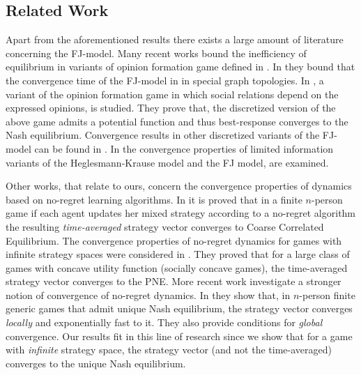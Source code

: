 \subsection{Related Work}
Apart from the aforementioned results there exists a large amount
of literature concerning the FJ-model.
Many recent works \cite{BGM13,CKO13,BFM16,EFHS17} bound the
inefficiency of equilibrium in variants of opinion formation game
defined in \cite{BKO11}. In \cite{GS14} they bound that the convergence
time of the FJ-model in in special graph topologies.
In \cite{BFM16}, a variant of the opinion formation game in which social
relations depend on the expressed opinions, is studied.
They prove that, the discretized version of the above game admits
a potential function and thus best-response converges to the
Nash equilibrium. Convergence results in other discretized variants of
the FJ-model can be found in \cite{YOASS13,FGV16}. In \cite{FPS16} the convergence
properties of limited information variants of the Heglesmann-Krause model \cite{HK}
and the FJ model, are examined.


Other works, that relate to ours, concern the convergence
properties of dynamics based on no-regret learning algorithms.
In \cite{FV97,FS99,SA00,SALS15} it is proved that in a finite $n$-person
game if each agent updates her mixed strategy according to a no-regret
algorithm the resulting \emph{time-averaged} strategy vector converges to
Coarse Correlated Equilibrium. The convergence properties of no-regret dynamics
for games with infinite strategy spaces were considered in \cite{EMN09}.
They proved that for a large class of games with concave utility function
(socially concave games), the time-averaged strategy vector converges to
the PNE. More recent work investigate a stronger notion of convergence of
no-regret dynamics. In \cite{CHM17} they show that,
in $n$-person finite generic games that admit unique Nash equilibrium,
the strategy vector converges \emph{locally} and exponentially fast
to it. They also provide conditions for \emph{global} convergence.
Our results fit in this line of research since we show that
for a game with \emph{infinite} strategy space, the strategy vector
(and not the time-averaged) converges to the unique Nash equilibrium.

